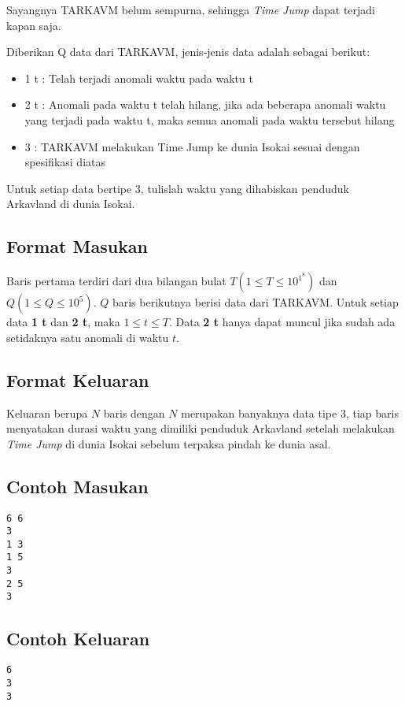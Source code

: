 \documentclass{article}
\begin{document}
Sayangnya TARKAVM belum sempurna, sehingga \textit{Time Jump} dapat terjadi kapan saja.

Diberikan Q data dari TARKAVM, jenis-jenis data adalah sebagai berikut:
\begin{itemize}
	\item1 t : Telah terjadi anomali waktu pada waktu t
	\item2 t : Anomali pada waktu t telah hilang, jika ada beberapa anomali waktu yang terjadi pada waktu t, maka semua anomali pada waktu tersebut hilang
	\item3 : TARKAVM melakukan Time Jump ke dunia Isokai sesuai dengan spesifikasi diatas
\end{itemize}
Untuk setiap data bertipe 3, tulislah waktu yang dihabiskan penduduk Arkavland di dunia Isokai.


\subsection*{Format Masukan}

Baris pertama terdiri dari dua bilangan bulat $T (1 \leq T \leq 10^1^8)$ dan $Q (1 \leq Q \leq 10^5)$. $Q$ baris berikutnya berisi data dari TARKAVM. Untuk setiap data \textbf{1 t} dan \textbf{2 t}, maka $1 \leq t \leq T$. Data \textbf{2 t} hanya dapat muncul jika sudah ada setidaknya satu anomali di waktu $t$.

\subsection*{Format Keluaran}

Keluaran berupa $N$ baris dengan $N$ merupakan banyaknya data tipe 3, tiap baris menyatakan durasi waktu yang dimiliki penduduk Arkavland setelah melakukan \textit{Time Jump} di dunia Isokai sebelum terpaksa pindah ke dunia asal.
\\

\begin{multicols}{2}
\subsection*{Contoh Masukan}
\begin{lstlisting}
6 6
3
1 3
1 5
3
2 5
3

\end{lstlisting}
\columnbreak
\subsection*{Contoh Keluaran}
\begin{lstlisting}
6
3
3
\end{lstlisting}
\vfill
\null
\end{multicols}
\end{document}
